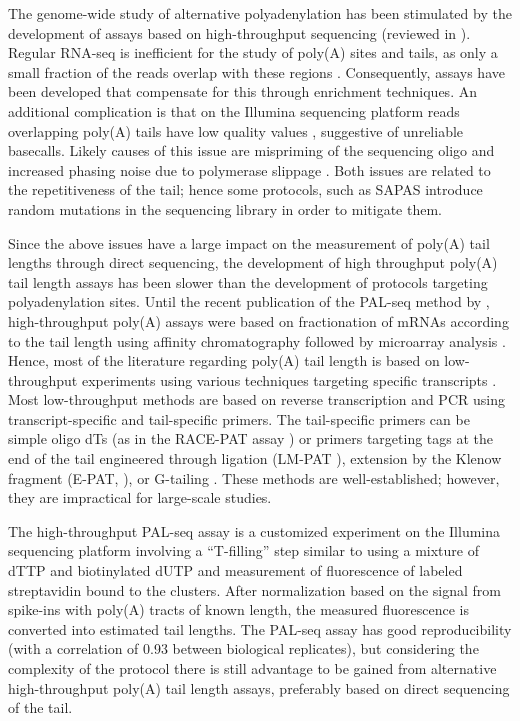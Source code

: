 \documentclass[10pt]{article}
\begin{document}
The genome-wide study of alternative polyadenylation has been stimulated by the development of assays based on high-throughput sequencing (reviewed in \cite{elkon13}). Regular RNA-seq is inefficient for the study of poly(A) sites and tails, as only a small fraction of the reads overlap with these regions \cite{fu11,wilkening13}. Consequently, assays have been developed that compensate for this through enrichment techniques. An additional complication is that on the Illumina sequencing platform reads overlapping poly(A) tails have low quality values \cite{wilkening13}, suggestive of unreliable basecalls. Likely causes of this issue are mispriming of the sequencing oligo and increased phasing noise due to polymerase slippage \cite{wilkening13}. Both issues are related to the repetitiveness of the tail; hence some protocols, such as SAPAS \cite{fu11} introduce random mutations in the sequencing library in order to mitigate them.

Since the above issues have a large impact on the measurement of poly(A) tail lengths through direct sequencing, the development of high throughput poly(A) tail length assays has been slower than the development of protocols targeting polyadenylation sites. Until the recent publication of the PAL-seq method by \cite{subtelny14}, high-throughput poly(A) assays were based on fractionation of mRNAs according to the tail length using affinity chromatography followed by microarray analysis \cite{beilharz07,meijer07}. Hence, most of the literature regarding poly(A) tail length is based on low-throughput experiments using various techniques targeting specific transcripts \cite{salles95}.
Most low-throughput methods are based on reverse transcription and PCR using transcript-specific and tail-specific primers. The tail-specific primers can be simple oligo dTs (as in the RACE-PAT assay \cite{salles95}) or primers targeting tags at the end of the tail engineered through ligation (LM-PAT \cite{salles95}), extension by the Klenow fragment (E-PAT, \cite{janicke12}), or G-tailing \cite{kusov01}. These methods are well-established; however, they are impractical for large-scale studies.

The high-throughput PAL-seq assay \cite{subtelny14} is a customized experiment on the Illumina sequencing platform involving a “T-filling” step similar to \cite{wilkening13} using a mixture of dTTP and biotinylated dUTP and measurement of fluorescence of labeled streptavidin bound to the clusters. After normalization based on the signal from spike-ins with poly(A) tracts of known length, the measured fluorescence is converted into estimated tail lengths. The PAL-seq assay has good reproducibility (with a correlation of 0.93 between biological replicates), but considering the complexity of the protocol there is still advantage to be gained from alternative high-throughput poly(A) tail length assays, preferably based on direct sequencing of the tail.
\end{document}
